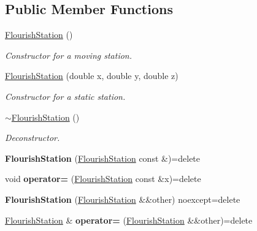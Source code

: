\subsection*{Public Member Functions}
\begin{DoxyCompactItemize}
\item 
\hyperlink{classFlourishStation_ace4a06cb1057847b37865681087c8af9}{Flourish\+Station} ()
\begin{DoxyCompactList}\small\item\em Constructor for a moving station. \end{DoxyCompactList}\item 
\hyperlink{classFlourishStation_a0eef2386a1e0a401c9b5537f40fd4438}{Flourish\+Station} (double x, double y, double z)
\begin{DoxyCompactList}\small\item\em Constructor for a static station. \end{DoxyCompactList}\item 
\hyperlink{classFlourishStation_a773f8325b054f417d6e73de5dba62984}{$\sim$\+Flourish\+Station} ()\hypertarget{classFlourishStation_a773f8325b054f417d6e73de5dba62984}{}\label{classFlourishStation_a773f8325b054f417d6e73de5dba62984}

\begin{DoxyCompactList}\small\item\em Deconstructor. \end{DoxyCompactList}\item 
{\bfseries Flourish\+Station} (\hyperlink{classFlourishStation}{Flourish\+Station} const \&)=delete\hypertarget{classFlourishStation_a4a8e1e586d17dea809d4a624f6ec24f4}{}\label{classFlourishStation_a4a8e1e586d17dea809d4a624f6ec24f4}

\item 
void {\bfseries operator=} (\hyperlink{classFlourishStation}{Flourish\+Station} const \&x)=delete\hypertarget{classFlourishStation_a520678ea7e11f0964c55d6a9c881305c}{}\label{classFlourishStation_a520678ea7e11f0964c55d6a9c881305c}

\item 
{\bfseries Flourish\+Station} (\hyperlink{classFlourishStation}{Flourish\+Station} \&\&other) noexcept=delete\hypertarget{classFlourishStation_a0cb3c168f35a4dcc80179446dc62e139}{}\label{classFlourishStation_a0cb3c168f35a4dcc80179446dc62e139}

\item 
\hyperlink{classFlourishStation}{Flourish\+Station} \& {\bfseries operator=} (\hyperlink{classFlourishStation}{Flourish\+Station} \&\&other)=delete\hypertarget{classFlourishStation_ad217d84bfc5195e5eb6d4532a8915cb1}{}\label{classFlourishStation_ad217d84bfc5195e5eb6d4532a8915cb1}


\end{DoxyCompactItemize}
